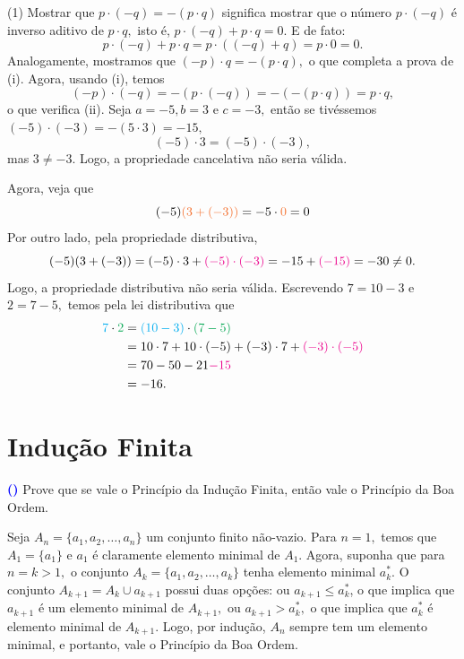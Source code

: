 \documentclass[12pt, a4paper]{article}
\newcommand{\negrito}[1]{\mbox{\boldmath{$#1$}}}
\newcounter{exercicio}[section]
\newenvironment{exercicio}[1][]{\refstepcounter{exercicio}\par\medskip
 \textcolor{blue}{\bf(\theexercicio)} \rmfamily}{\medskip }
\newcommand{\itens}[1]{\begin{tasks}[label={(tsk[a])},label-width=3.6ex, label-format = {\bfseries}, column-sep = {0pt}](1) #1\end{tasks}}
\newcommand{\alt}[1]{\textcolor{Floresta}{$\negrito{(#1)} $}}
\begin{document}
\begin{solution}
\itens{
\task[\alt{a}] Mostrar que $p \cdot (-q) = -(p \cdot q)$ significa mostrar que o número $p \cdot (-q)$ é inverso aditivo de $p \cdot q,$ isto é, $p \cdot (-q) + p \cdot q = 0.$ E de fato:
\[
p \cdot (-q)+ p \cdot q = p \cdot ((-q)+q) = p \cdot 0 = 0.
\]
Analogamente, mostramos que $(-p) \cdot q = - (p \cdot q),$ o que completa a prova de (i).
Agora, usando (i), temos
\[
(-p) \cdot (-q) = -(p \cdot (-q)) = -(-(p \cdot q)) = p \cdot q,
\]
o que verifica (ii).
\task[\alt{b}] Seja $a = -5, b = 3$ e $c = -3,$ então se tivéssemos $(-5) \cdot (-3) = - (5 \cdot 3) = -15,$
\[
(-5) \cdot 3 = (-5) \cdot (-3),
\]
mas $3 \neq -3.$ Logo, a propriedade cancelativa não seria válida.

Agora, veja que 
\[
(-5)\textcolor{Orange}{(3 + (-3))} = -5 \cdot \textcolor{Orange}{0} = 0
\]
Por outro lado, pela propriedade distributiva,
\[
(-5)(3 + (-3)) = (-5) \cdot 3 + \textcolor{Magenta}{(-5) \cdot (-3)} = - 15 + \textcolor{Magenta}{(-15)} = - 30 \neq 0.
\]
Logo, a propriedade distributiva não seria válida.
\task[\alt{c}] Escrevendo $7 = 10 - 3$ e $2 = 7 - 5,$ temos pela lei distributiva que
\begin{align*}
\textcolor{Cyan}{7} \cdot \textcolor{Green}{2} &= \textcolor{Cyan}{(10 - 3)} \cdot \textcolor{Green}{(7-5)} \\&= 10 \cdot 7 + 10 \cdot (-5) + (-3) \cdot 7 + \textcolor{Magenta}{(-3) \cdot (-5)} \\&= 70 - 50 - 21 \textcolor{Magenta}{-15} \\&= -16.
\end{align*}
}
\end{solution}
\newpage
\section{Indução Finita}
\begin{exercicio}
Prove que se vale o Princípio da Indução Finita, então vale o Princípio da Boa Ordem.
\end{exercicio}
\begin{solution}
Seja $A_n = \{a_1, a_2, \ldots, a_n \}$ um conjunto finito não-vazio. Para $n = 1,$ temos que $A_1 = \{a_1\}$ e
$a_1$ é claramente elemento minimal de $A_1$. Agora, suponha que para $n = k > 1,$ o conjunto $A_k = \{a_1, a_2, \ldots, a_k \}$ tenha elemento minimal $a_k^{*}$.
O conjunto $A_{k+1} = A_k \cup {a_{k+1}}$ possui duas opções: ou $a_{k+1} \le a_k^{*}$, o que implica que $a_{k+1}$ é um elemento
minimal de $A_{k+1},$ ou $a_{k+1} > a_k^{*},$ o que implica que $a^{*}_k$ é elemento minimal de $A_{k+1}.$ Logo, por
indução, $A_n$ sempre tem um elemento minimal, e portanto, vale o Princípio da Boa Ordem.
\end{solution}
\end{document}

